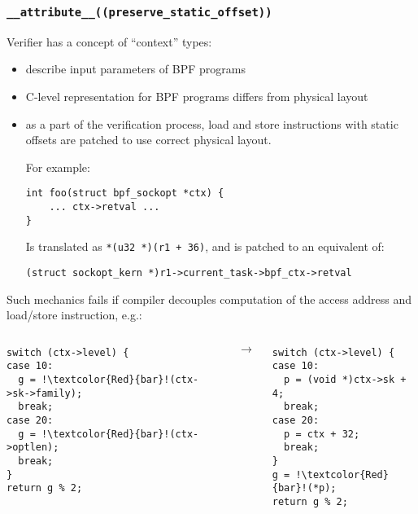 \documentclass{beamer}
\newcommand{\code}[1]{\texttt{#1}}
\begin{document}
\begin{frame}
  \frametitle{\large\code{\_\_attribute\_\_((preserve\_static\_offset))}}

  Verifier has a concept of ``context'' types:
  \begin{itemize}
  \item describe input parameters of BPF programs
  \item C-level representation for BPF programs differs from physical layout
  \item as a part of the verification process, load and store
    instructions with static offsets are patched to use correct physical layout.

  For example:

  \begin{verbatim}
int foo(struct bpf_sockopt *ctx) {
	... ctx->retval ...      
}
  \end{verbatim}

  Is translated as \code{*(u32 *)(r1 + 36)}, and is patched to an
  equivalent of:

  \begin{verbatim}
(struct sockopt_kern *)r1->current_task->bpf_ctx->retval
  \end{verbatim}
  \end{itemize}

  \framebreak

  Such mechanics fails if compiler decouples computation of the
  access address and load/store instruction, e.g.:

  \begin{columns}
    \begin{verbatim}
switch (ctx->level) {
case 10:
  g = !\textcolor{Red}{bar}!(ctx->sk->family);
  break;
case 20:
  g = !\textcolor{Red}{bar}!(ctx->optlen);
  break;
}
return g % 2;
    \end{verbatim}

    $\rightarrow$

    \begin{verbatim}
switch (ctx->level) {
case 10:
  p = (void *)ctx->sk + 4;
  break;
case 20:
  p = ctx + 32;
  break;
}
g = !\textcolor{Red}{bar}!(*p);
return g % 2;
    \end{verbatim}
  \end{columns}

  \framebreak


\end{frame}
\end{document}
